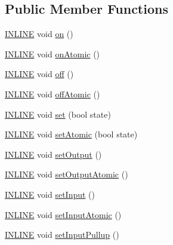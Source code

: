 \subsection*{Public Member Functions}
\begin{DoxyCompactItemize}
\item 
\hyperlink{io_8h_a2eb6f9e0395b47b8d5e3eeae4fe0c116}{I\-N\-L\-I\-N\-E} void \hyperlink{classflame_1_1_pin_implementation_a5ee64200c99231a1ba1b6e724d53f3bf}{on} ()
\item 
\hyperlink{io_8h_a2eb6f9e0395b47b8d5e3eeae4fe0c116}{I\-N\-L\-I\-N\-E} void \hyperlink{classflame_1_1_pin_implementation_ad4a7397f4abe95df89b28a2209bed782}{on\-Atomic} ()
\item 
\hyperlink{io_8h_a2eb6f9e0395b47b8d5e3eeae4fe0c116}{I\-N\-L\-I\-N\-E} void \hyperlink{classflame_1_1_pin_implementation_a01979e241b9d5aa9b76fc3a90d8938ce}{off} ()
\item 
\hyperlink{io_8h_a2eb6f9e0395b47b8d5e3eeae4fe0c116}{I\-N\-L\-I\-N\-E} void \hyperlink{classflame_1_1_pin_implementation_aa488f6f695dbf9a477d470d891ea17f9}{off\-Atomic} ()
\item 
\hyperlink{io_8h_a2eb6f9e0395b47b8d5e3eeae4fe0c116}{I\-N\-L\-I\-N\-E} void \hyperlink{classflame_1_1_pin_implementation_a980549afcbc44720bb9d01706318985b}{set} (bool state)
\item 
\hyperlink{io_8h_a2eb6f9e0395b47b8d5e3eeae4fe0c116}{I\-N\-L\-I\-N\-E} void \hyperlink{classflame_1_1_pin_implementation_ae2ea926f7c081bea35247f0b9d03483e}{set\-Atomic} (bool state)
\item 
\hyperlink{io_8h_a2eb6f9e0395b47b8d5e3eeae4fe0c116}{I\-N\-L\-I\-N\-E} void \hyperlink{classflame_1_1_pin_implementation_abf6851b4b0c78d5c5c8e3aec7600a83e}{set\-Output} ()
\item 
\hyperlink{io_8h_a2eb6f9e0395b47b8d5e3eeae4fe0c116}{I\-N\-L\-I\-N\-E} void \hyperlink{classflame_1_1_pin_implementation_a3f3bb8ec54186e16fbb2670cf2e99460}{set\-Output\-Atomic} ()
\item 
\hyperlink{io_8h_a2eb6f9e0395b47b8d5e3eeae4fe0c116}{I\-N\-L\-I\-N\-E} void \hyperlink{classflame_1_1_pin_implementation_af4aa98133baf5f86180abc911109b90a}{set\-Input} ()
\item 
\hyperlink{io_8h_a2eb6f9e0395b47b8d5e3eeae4fe0c116}{I\-N\-L\-I\-N\-E} void \hyperlink{classflame_1_1_pin_implementation_a3b4d71dda7c0165b4477671ab8f9ab91}{set\-Input\-Atomic} ()
\item 
\hyperlink{io_8h_a2eb6f9e0395b47b8d5e3eeae4fe0c116}{I\-N\-L\-I\-N\-E} void \hyperlink{classflame_1_1_pin_implementation_a7c609a01c4f035238e35fc229c8b3498}{set\-Input\-Pullup} ()

\end{DoxyCompactItemize}
